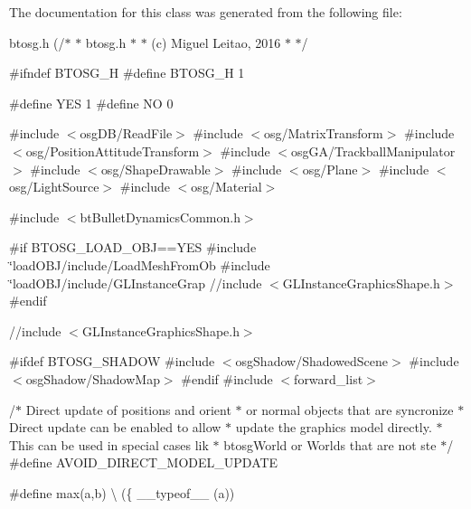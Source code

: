 The documentation for this class was generated from the following file\+:\begin{DoxyCompactItemize}
\item 
btosg.\+h (/$\ast$
 $\ast$	btosg.\+h
 $\ast$
 $\ast$	(c) Miguel Leitao, 2016
 $\ast$
 $\ast$/

\#ifndef B\+T\+O\+S\+G\+\_\+\+H
\#define B\+T\+O\+S\+G\+\_\+\+H 1

\#define Y\+E\+S 1
\#define N\+O  0

\#include $<$osg\+D\+B/\+Read\+File$>$
\#include $<$osg/\+Matrix\+Transform$>$
\#include $<$osg/\+Position\+Attitude\+Transform$>$
\#include $<$osg\+G\+A/\+Trackball\+Manipulator$>$
\#include $<$osg/\+Shape\+Drawable$>$
\#include $<$osg/\+Plane$>$
\#include $<$osg/\+Light\+Source$>$
\#include $<$osg/\+Material$>$

\#include $<$bt\+Bullet\+Dynamics\+Common.\+h$>$

\#if B\+T\+O\+S\+G\+\_\+\+L\+O\+A\+D\+\_\+\+O\+B\+J==\+Y\+E\+S
\#include \char`\"{}load\+O\+B\+J/include/\+Load\+Mesh\+From\+Ob
\#include \char`\"{}load\+O\+B\+J/include/\+G\+L\+Instance\+Grap
//include $<$\+G\+L\+Instance\+Graphics\+Shape.\+h$>$
\#endif

//include $<$\+G\+L\+Instance\+Graphics\+Shape.\+h$>$

\#ifdef B\+T\+O\+S\+G\+\_\+\+S\+H\+A\+D\+O\+W
\#include $<$osg\+Shadow/\+Shadowed\+Scene$>$
\#include $<$osg\+Shadow/\+Shadow\+Map$>$
\#endif
\#include $<$forward\+\_\+list$>$

/$\ast$ Direct update of positions and orient
 $\ast$ or normal objects that are syncronize
 $\ast$ Direct update can be enabled to allow
 $\ast$ update the graphics model directly.
 $\ast$ This can be used in special cases lik
 $\ast$ btosg\+World or Worlds that are not ste
 $\ast$/
\#define A\+V\+O\+I\+D\+\_\+\+D\+I\+R\+E\+C\+T\+\_\+\+M\+O\+D\+E\+L\+\_\+\+U\+P\+D\+A\+T\+E

\#define max(a,b) \textbackslash{}
   (\{ \+\_\+\+\_\+typeof\+\_\+\+\_\+ (a))\end{DoxyCompactItemize}
